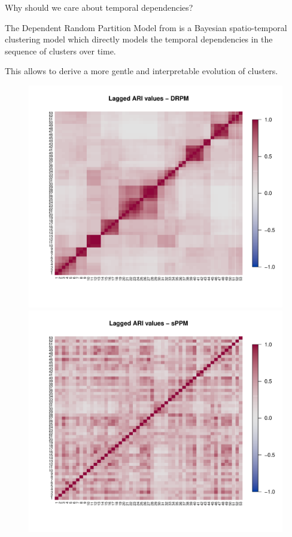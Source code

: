 \documentclass[
	11pt, %
 xcolor={dvipsnames,svgnames}
]{beamer}
\let\cite\citep
\begin{document}
\begin{frame}{Why should we care about temporal dependencies?}

\begin{block}{}
The \alert{Dependent} Random Partition Model from \cite{1-drpm} is a Bayesian spatio-temporal clustering model which        \alert{directly models the temporal dependencies in the sequence of clusters over time.}
\end{block}
This allows to derive a more gentle and interpretable evolution of clusters.
\begin{figure}
    \centering
    \includegraphics[clip,trim=50px 60px 17px 24px, width=0.45\linewidth]{imgs/ari_drpm.pdf}
    \includegraphics[clip,trim=50px 60px 17px 24px, width=0.45\linewidth]{imgs/ari_sppm.pdf}
\end{figure}
\end{frame}
\end{document}
